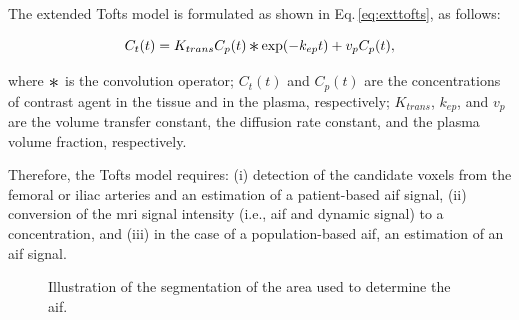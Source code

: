 The extended Tofts model is formulated as shown in
Eq.\,\eqref{eq:exttofts}, as follows:

\begin{equation}
  C_t(t) = K_{trans} C_p(t) \Conv \exp(-k_{ep}t) + v_p C_p(t),
  \label{eq:exttofts}
\end{equation}

\noindent where $\Conv$ is the convolution operator; $C_t(t)$ and $C_p(t)$ are the concentrations of contrast agent in the tissue and in the plasma, respectively; $K_{trans}$, $k_{ep}$, and $v_p$ are the volume transfer constant, the diffusion rate constant, and the plasma volume fraction, respectively.

Therefore, the Tofts model requires:
(i) detection of the candidate voxels from the femoral or iliac
arteries and an estimation of a patient-based \ac{aif} signal,
(ii) conversion of  the \ac{mri} signal intensity (i.e., \ac{aif} and dynamic signal) to a concentration, and
(iii) in the case of a population-based \ac{aif}, an estimation of an \ac{aif} signal.

\begin{figure}
  \centering
  \hspace*{\fill}
   \hfill
   \hfill
  \hspace*{\fill}
  \caption{Illustration of the segmentation of the area used to determine the \acs*{aif}.}
  \label{fig:aif}
\end{figure}


